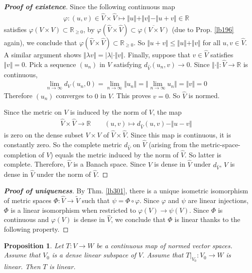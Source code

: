 \documentclass[12pt,b5paper,notitlepage]{article}
\theoremstyle{definition}
\theoremstyle{plain}
\newtheorem{pp}[df]{Proposition}
\newcommand{\wtd}{\widetilde}
\newcommand{\wht}{\widehat}
\newcommand{\ovl}{\overline}
\newcommand{\Rbb}{\mathbb R}
\numberwithin{equation}{section}
\begin{document}
\begin{proof}[\textbf{Proof of existence}]
Since the following continuous map
\begin{gather*}
\varphi:(u,v)\in\wht V\times\wht V\mapsto \Vert u\Vert+\Vert v\Vert-\Vert u+v\Vert\in\Rbb
\end{gather*}
satisfies $\varphi(V\times V)\subset\Rbb_{\geq0}$, by $\varphi(\wht V\times \wht V)\subset\ovl{\varphi(V\times V)}$ (due to Prop. \ref{lb196} again), we conclude that $\varphi(\wht V\times\wht V)\subset \Rbb_{\geq0}$. So $\Vert u+v\Vert\leq \Vert u\Vert+\Vert v\Vert$ for all $u,v\in\wht V$. A similar argument shows $\Vert\lambda v\Vert=|\lambda|\cdot\Vert v\Vert$. Finally, suppose that $v\in\wht V$ satisfies $\Vert v\Vert =0$. Pick a sequence $(u_n)$ in $V$ satisfying $d_{\wht V}(u_n,v)\rightarrow 0$. Since $\Vert\cdot\Vert:\wht V\rightarrow\Rbb$ is continuous, 
\begin{align*}
\lim_{n\rightarrow\infty}d_V(u_n,0)=\lim_{n\rightarrow\infty}\Vert u_{n}\Vert=\big\Vert \lim_{n\rightarrow\infty}u_n\big\Vert=\Vert v\Vert=0
\end{align*}
Therefore $(u_n)$ converges to $0$ in $V$. This proves $v=0$. So $\wht V$ is normed.

Since the metric on $V$ is induced by the norm of $V$, the map
\begin{gather*}
\wht V\times\wht V\rightarrow\Rbb\qquad (u,v)\mapsto d_{\wht V}(u,v)-\Vert u-v\Vert
\end{gather*}
is zero on the dense subset $V\times V$ of $\wht V\times\wht V$. Since this map is continuous, it is constantly zero. So the complete metric $d_{\wht V}$ on $\wht V$ (arising from the metric-space-completion of $V$) equals the metric induced by the norm of $\wht V$. So latter is complete. Therefore, $\wht V$ is a Banach space. Since $V$ is dense in $\wht V$ under $d_{\wht V}$, $V$ is dense in $\wht V$ under the norm of $\wht V$.
\end{proof}


\begin{proof}[\textbf{Proof of uniqueness}]
By Thm. \ref{lb301}, there is a unique isometric isomorphism of metric spaces $\Phi:\wht V\rightarrow\wtd V$ such that $\psi=\Phi\circ\varphi$. Since $\varphi$ and $\psi$ are linear injections, $\Phi$ is a linear isomorphism when restricted to $\varphi(V)\rightarrow\psi(V)$. Since $\Phi$ is continuous and $\varphi(V)$ is dense in $\wht V$, we conclude that $\Phi$ is linear thanks to the following property.
\end{proof}


\begin{pp}\label{lb315}
Let $T:V\rightarrow W$ be a continuous map of normed vector spaces. Assume that $V_0$ is a dense linear subspace of $V$. Assume that $T|_{V_0}:V_0\rightarrow W$ is linear. Then $T$ is linear.
\end{pp}
\end{document}
